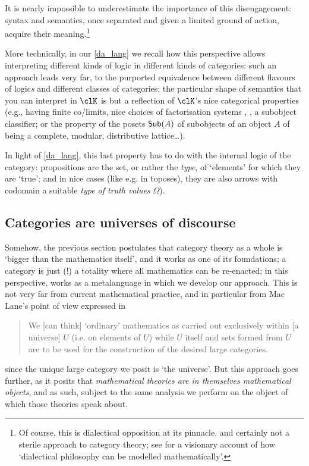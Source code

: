 It is nearly impossible to underestimate the importance of this disengagement: syntax and semantics, once separated and given a limited ground of action, acquire their meaning.\footnote{Of course, this is dialectical opposition at its pinnacle, and certainly not a sterile approach to category theory; see \cite{lawvere1996unity} for a visionary account of how `dialectical philosophy can be modelled mathematically'.}

More technically, in our \autoref{da_lang} we recall how this perspective allows interpreting different kinds of logic in different kinds of categories: such an approach leads very far, to the purported equivalence between different flavours of logic\emph{s} and different classes of categories; the particular shape of semantics that you can interpret in $\clK$ is but a reflection of $\clK$'s nice categorical properties (e.g., having finite co/limits, nice choices of factorisation systems \cite[5.5]{Bor1}, \cite{FK}, a subobject classifier; or the property of the posets $\mathsf{Sub}(A)$ of subobjects of an object $A$ of being a complete, modular, distributive lattice\dots).

In light of \autoref{da_lang}, this last property has to do with the internal logic of the category: propositions are the set, or rather the \emph{type}, of `elements' for which they are `true'; and in nice cases (like e.g. in toposes), they are also arrows with codomain a suitable \emph{type of truth values} $\Omega$).
\subsection{Categories are universes of discourse}\label{are_universes}
Somehow, the previous section postulates that category theory as a whole is `bigger than the mathematics itself', and it works as one of its foundations; a category is just (!) a totality where all mathematics can be re-enacted; in this perspective,  works as a metalanguage in which we develop our approach. This is not very far from current mathematical practice, and in particular from Mac Lane's point of view expressed in
\begin{quote}
    We [can think] `ordinary' mathematics as carried out exclusively within [a universe] $U$ (i.e. on elements of $U$) while $U$ itself and sets formed from $U$ are to be used for the construction of the desired large categories.\hfill \cite[I.6]{McL}
\end{quote}
since the unique large category we posit is `the universe'. But this approach goes further, as it posits that \emph{mathematical theories are in themselves mathematical objects}, and as such, subject to the same analysis we perform on the object of which those theories speak about.


